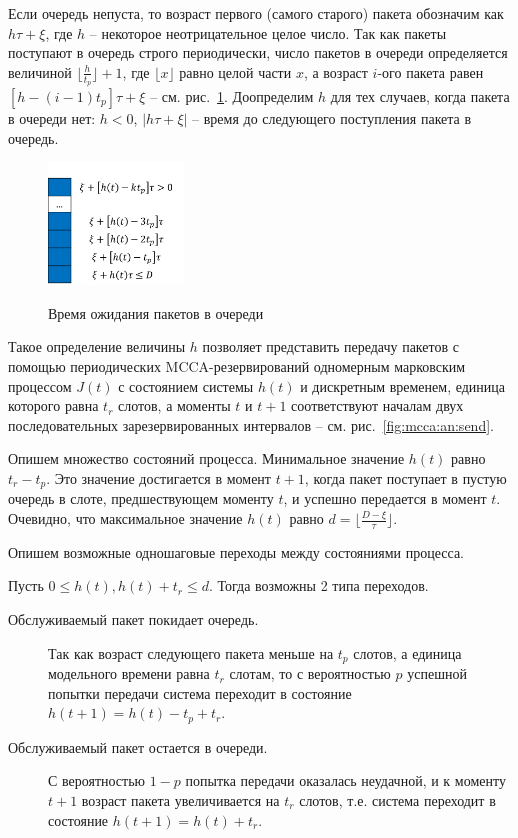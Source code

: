 Если очередь непуста, то возраст первого (самого старого) пакета обозначим как $h \tau+\xi$, где $h$ -- некоторое неотрицательное целое число. Так как пакеты поступают  в очередь строго периодически, число пакетов в очереди определяется величиной $\lfloor\frac{h}{t_p}\rfloor+1$, где $\lfloor x \rfloor$ равно целой части $x$, а возраст $i$-ого пакета равен $[h - (i-1)t_p ]\tau + \xi$ -- см. рис.~\ref{fig:mcca:an:queue}. Доопределим $h$ для тех случаев, когда пакета в очереди нет: $h<0$, $|h \tau+\xi|$ -- время до следующего поступления пакета в очередь.

\begin{figure}
 \centering
      \includegraphics[width=0.32\textwidth]{pic/queue.png} \\
     \caption{\label{fig:mcca:an:queue}  Время ожидания пакетов в очереди}
 \end{figure}

Такое определение величины $h$ позволяет представить передачу пакетов с помощью периодических MCCA-резервирований одномерным марковским процессом $J(t)$ с состоянием системы $h(t)$ и дискретным временем, единица которого равна $t_r$ слотов, а моменты  $t$ и $t+1$  соответствуют началам двух последовательных зарезервированных интервалов -- см. рис.~\ref{fig:mcca:an:send}.

Опишем множество состояний процесса. Минимальное значение $h(t)$ равно $t_r - t_p$. Это значение достигается в момент $t+1$, когда пакет поступает в пустую очередь в слоте, предшествующем моменту $t$, и успешно передается в момент $t$. Очевидно, что максимальное значение $h(t)$ равно $d=\lfloor \frac{D-\xi}{\tau}\rfloor$.

Опишем возможные одношаговые переходы между состояниями процесса.

Пусть $0 \leq h(t), h(t)+t_r\leq d$. Тогда возможны 2 типа переходов.

 \begin{description}
   \item[Обслуживаемый пакет покидает очередь.] Так как возраст следующего пакета меньше на $t_p$ слотов, а единица модельного времени равна $t_r$ слотам, то с вероятностью $p$ успешной попытки передачи система переходит в состояние  $h(t+1) = h(t) - t_p + t_r$.
   \item[Обслуживаемый пакет остается в очереди.] С вероятностью $1-p$ попытка передачи оказалась неудачной, и к моменту $t+1$ возраст пакета увеличивается на $t_r$ слотов, т.е. система переходит в состояние $h(t+1)=h(t)+t_r$.
 \end{description}

